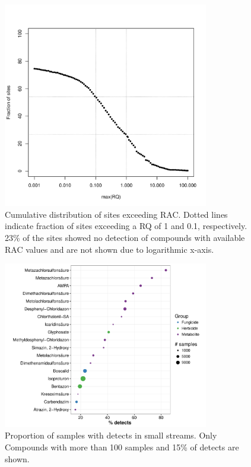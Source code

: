 \documentclass[pdftex,
	a4paper,
	titlepage=false]{scrreprt}
\begin{document}
\begin{figure}[ht]
	\centering
	\includegraphics[width = 0.8\textwidth]{prac_ex}
	\caption[Cumulative distribution of the number sites exceeding RAC.]{Cumulative distribution of sites exceeding RAC. Dotted lines indicate fraction of sites exceeding a RQ of 1 and 0.1, respectively. 23\% of the sites showed no detection of compounds with available RAC values and are not shown due to logarithmic x-axis.}
	\label{fig:prac_ex}
\end{figure}


\begin{figure}[ht]
	\centering
	\includegraphics[width = 0.8\textwidth]{pdetects}
	\caption[Proportion of samples with detects in small streams.]{Proportion of samples with detects in small streams. Only Compounds with more than 100 samples and 15\% of detects are shown.}
	\label{fig:pdetects}
\end{figure}
\end{document}
